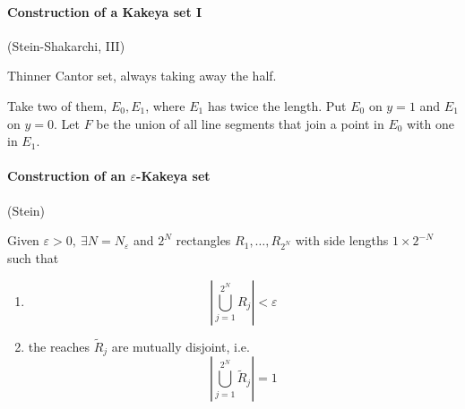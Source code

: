 \paragraph{Construction of a Kakeya set I} (Stein-Shakarchi, III)

Thinner Cantor set, always taking away the half.

Take two of them, $E_0,E_1$, where $E_1$ has twice the length. Put $E_0$ on $y=1$ and $E_1$ on $y=0$. Let $F$ be the union of all line segments that join a point in $E_0$ with one in $E_1$.

\paragraph{Construction of an $ε$-Kakeya set} (Stein)


\begin{theo} Given $ε>0,\ ∃N=N_ε$ and $2^N$ rectangles $R_1,…,R_{2^N}$ with side lengths $1\times 2^{-N}$ such that
	\begin{enumerate}
		\item \[|\bigcup_{j=1}^{2^N}R_j|<ε\]
		\item the reaches $\tilde R_j$ are mutually disjoint, i.e.\ \[|\bigcup_{j=1}^{2^N}\tilde R_j|=1\]
	\end{enumerate}
\end{theo}
